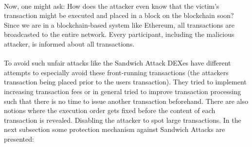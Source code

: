 \documentclass{article}
\begin{document}
\\
Now, one might ask: How does the attacker even know that the victim's transaction might be executed and placed in a block on the blockchain soon? Since we are in a blockchain-based system like Ethereum, all transactions are broadcasted to the entire network. Every participant, including the malicious attacker, is informed about all transactions.\\
\\
To avoid such unfair attacks like the Sandwich Attack DEXes have different attempts to especially avoid these front-running transactions (the attackers transaction being placed prior to the users transaction). They tried to implement increasing transaction fees or in general tried to improve transaction processing such that there is no time to issue another transaction beforehand. There are also notions where the execution order gets fixed before the content of each transaction is revealed. Disabling the attacker to spot large transactions. In the next subsection some protection mechanism against Sandwich Attacks are presented:\\
\end{document}
